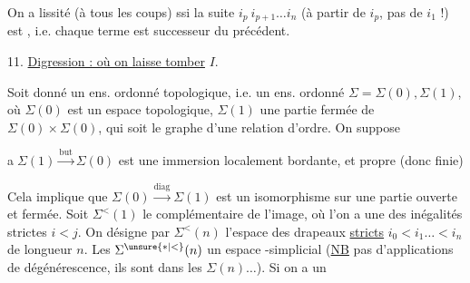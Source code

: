 On a lissité (à tous les coups) ssi  la suite $i_p\ i_{p+1}\ldots i_n$ (à partir de $i_p$, pas de $i_1$ !) est , i.e. chaque terme  est successeur  du précédent.

11. \uline{Digression : où on laisse tomber} $I$.

Soit donné un ens. ordonné topologique, i.e. un  ens. ordonné $\Sigma=\Sigma(0),\Sigma(1)$, où $\Sigma(0)$ est un espace topologique, $\Sigma(1)$ une partie fermée de $\Sigma(0)\times\Sigma(0)$, qui soit le graphe d'une relation d'ordre. On suppose

\textcircled{a}\quad $\Sigma(1)\xrightarrow{\mathrm{but}}\Sigma(0)$ est une immersion localement bordante, et propre (donc finie)

 Cela implique que $\Sigma(0)\xrightarrow{\mathrm{diag}}\Sigma(1)$ est un isomorphisme sur une partie ouverte et fermée. Soit $\Sigma^{<}(1)$ le complémentaire de l'image, où l'on a une des inégalités strictes $i<j$. On désigne par $\Sigma^{<}(n)$ l'espace des drapeaux \uline{stricts} $i_0<i_1\ldots<i_n$ de longueur $n$. Les $\Sigma^{\unsure{*|<}}(n)$  un espace -simplicial (\uline{NB} pas d'applications de dégénérescence,  ils sont dans les $\Sigma(n)\ldots$).  Si on a un

